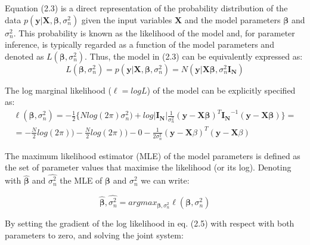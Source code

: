 Equation (2.3) is a direct representation of the probability distribution of the data $p(\mathbf{y}| \mathbf{X}, \boldsymbol{\beta}, \sigma_n^2)$ given the input variables $\mathbf{X}$ and the model parameters $\boldsymbol{\beta}$ and $\sigma_n^2$.
This probability is known as the likelihood of the model and, for parameter inference, is typically regarded as a function of the model parameters and denoted as $L(\boldsymbol{\beta}, \sigma_n^2)$. 
Thus, the model in (2.3) can be equivalently expressed as:\\

\begin{equation} \label{eq4:Linear_regression_likelihood}
 L(\boldsymbol{\beta}, \sigma_n^2) = p(\mathbf{y}| \mathbf{X}, \boldsymbol{\beta}, \sigma_n^2) = N(\mathbf{y} | \mathbf{X}\boldsymbol{\beta}, \sigma_n^2 \mathbf{I_N}) 
\end{equation}

The log marginal likelihood ($\ell = logL$) of the model can be explicitly specified as:\\

\begin{equation} \label{eq5:Linear_regression_log_likelihood}
\begin{split}
 \ell(\boldsymbol{\beta}, \sigma_n^2) = -\frac{1}{2} \bigg\{Nlog(2\pi)\sigma_n^2) + log|\mathbf{I_N}| \frac{1}{\sigma_n^2}(\mathbf{y}-\mathbf{X}\boldsymbol{\beta})^T\mathbf{I_N}^{-1}(\mathbf{y}-\mathbf{X}\boldsymbol{\beta}) \bigg\}  = \\
= -\frac{N}{2}log(2\pi)) - \frac{N}{2}log(2\pi))- 0 - \frac{1}{2\sigma_n^2}(\mathbf{y}-\mathbf{X}\beta)^T(\mathbf{y}-\mathbf{X}\beta)  
\end{split}
\end{equation}

The maximum likelihood estimator (MLE) of the model parameters is defined as the set of parameter values that maximise the likelihood (or its log). Denoting with $\hat{\boldsymbol{\beta}}$ and $\hat{\sigma_n^2}$ the MLE of $\boldsymbol{\beta}$ and $\sigma_n^2$ we can write:

\begin{equation} \label{eq6:Linear_regression_MLEs}
\hat{\boldsymbol{\beta}},\hat{\sigma_n^2} = argmax_{\boldsymbol{\beta},\sigma_n^2}\ell(\boldsymbol{\beta}, \sigma_n^2) 
\end{equation} 

By setting the gradient of the log likelihood in eq. (2.5) with respect with both parameters to zero, and solving the joint system:

